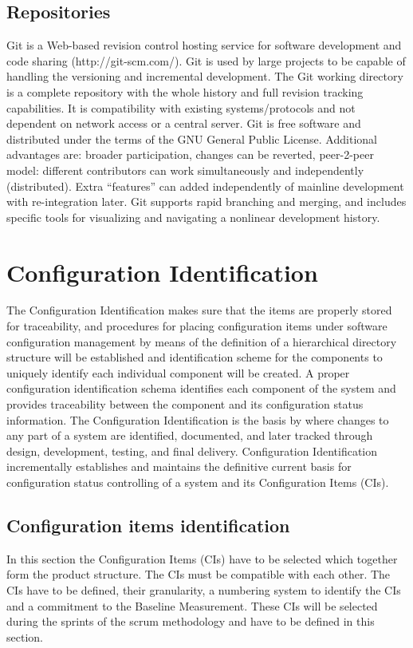 \documentclass{template/openetcs_article}
\begin{document}
\subsection{Repositories} %
Git is a Web-based revision control hosting service for software development and code sharing (http://git-scm.com/). Git is  used by large projects to be capable of handling the versioning and incremental development. The Git working directory is a  complete repository with the whole history and full revision tracking capabilities. It is compatibility with existing  systems/protocols and not dependent on network access or a central server. Git is free software and distributed under the  terms of the GNU General Public License.
Additional advantages are: broader participation, changes can be reverted, peer-2-peer model: different contributors can  work simultaneously and independently (distributed). Extra “features” can added independently of mainline development with  re-integration later. Git supports rapid branching and merging, and includes specific tools for visualizing and navigating a  nonlinear development history.

\section{Configuration Identification} %
The Configuration Identification makes sure that the items are properly stored for traceability, and procedures for placing  configuration items under software configuration management by means of the definition of a hierarchical directory structure  will be established and identification scheme for the components to uniquely identify each individual component will be created.  A proper configuration identification schema identifies each component of the system and provides traceability between the  component and its configuration status information. 
The Configuration Identification is the basis by where changes to any part of a system are identified, documented, and later  tracked through design, development, testing, and final delivery. Configuration Identification incrementally establishes and  maintains the definitive current basis for configuration status controlling of a system and its Configuration Items (CIs).

\subsection{Configuration items identification} %
In this section the Configuration Items (CIs) have to be selected which together form the product structure. The CIs must be  compatible with each other. The CIs have to be defined, their granularity, a numbering system to identify the CIs and a  commitment to the Baseline Measurement. These CIs will be selected during the sprints of the scrum methodology and have to  be defined in this section.
\end{document}
